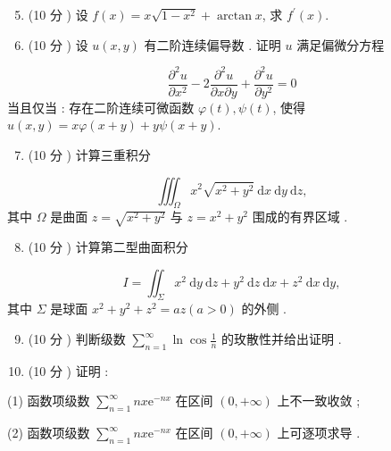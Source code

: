 \documentclass[10pt]{article}
\begin{document}
\begin{enumerate}
  \setcounter{enumi}{4}
  \item (10  分 )  设  $f(x)=x \sqrt{1-x^{2}}+\arctan x$,  求  $f^{\prime}(x)$.

  \item (10  分 )  设  $u(x, y)$  有二阶连续偏导数 .  证明  $u$  满足偏微分方程 

\end{enumerate}
$$
\frac{\partial^{2} u}{\partial x^{2}}-2 \frac{\partial^{2} u}{\partial x \partial y}+\frac{\partial^{2} u}{\partial y^{2}}=0
$$
 当且仅当 :  存在二阶连续可微函数  $\varphi(t), \psi(t)$,  使得  $u(x, y)=x \varphi(x+y)+y \psi(x+y)$.

\begin{enumerate}
  \setcounter{enumi}{6}
  \item (10  分 )  计算三重积分 
\end{enumerate}
$$
\iiint_{\Omega} x^{2} \sqrt{x^{2}+y^{2}} \mathrm{~d} x \mathrm{~d} y \mathrm{~d} z,
$$
 其中  $\Omega$  是曲面  $z=\sqrt{x^{2}+y^{2}}$  与  $z=x^{2}+y^{2}$  围成的有界区域 .

\begin{enumerate}
  \setcounter{enumi}{7}
  \item (10  分 )  计算第二型曲面积分 
\end{enumerate}
$$
I=\iint_{\Sigma} x^{2} \mathrm{~d} y \mathrm{~d} z+y^{2} \mathrm{~d} z \mathrm{~d} x+z^{2} \mathrm{~d} x \mathrm{~d} y,
$$
 其中  $\Sigma$  是球面  $x^{2}+y^{2}+z^{2}=a z(a>0)$  的外侧 .

\begin{enumerate}
  \setcounter{enumi}{8}
  \item (10  分 )  判断级数  $\sum_{n=1}^{\infty} \ln \cos \frac{1}{n}$  的玫散性并给出证明 .

  \item (10  分 )  证明 :

\end{enumerate}
(1)  函数项级数  $\sum_{n=1}^{\infty} n x \mathrm{e}^{-n x}$  在区间  $(0,+\infty)$  上不一致收敛 ;

(2)  函数项级数  $\sum_{n=1}^{\infty} n x \mathrm{e}^{-n x}$  在区间  $(0,+\infty)$  上可逐项求导 .
\end{document}
